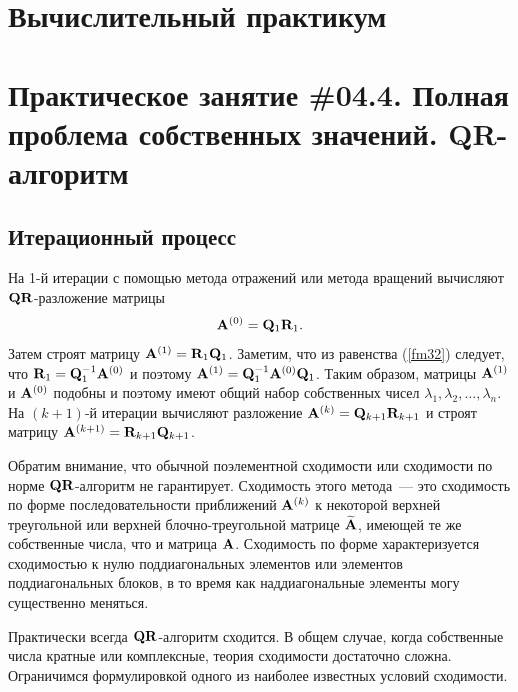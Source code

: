 \documentclass[12pt]{article}
\begin{document}
	\begin{flushright}
	\end{flushright}
	\begin{flushright}
	\end{flushright}
    \section*{Вычислительный практикум}
    \section*{Практическое занятие \#04.4. Полная проблема собственных значений. QR-алгоритм}

	\subsection*{Итерационный процесс}
	
	На 1-й итерации с помощью метода отражений или метода вращений вычисляют $\bold{QR}$-разложение матрицы
	\begin{equation}
		\bold{A}^{\left(0\right)}=\bold{Q}_1\bold{R}_1.\label{fm32}
	\end{equation}
	Затем строят матрицу $\bold{A}^{\left(1\right)}=\bold{R}_1\bold{Q}_1$. Заметим, что из равенства (\ref{fm32}) следует, что $\bold{R}_1=\bold{Q}^{-1}_1\bold{A}^{\left(0\right)}$ и поэтому $\bold{A}^{\left(1\right)}=\bold{Q}_1^{-1}\bold{A}^{\left(0\right)}\bold{Q}_1$. Таким образом, матрицы $\bold{A}^{\left(1\right)}$ и $\bold{A}^{\left(0\right)}$ подобны и поэтому имеют общий набор собственных чисел $\lambda_1,\lambda_2,\ldots,\lambda_n$. На $\left(k+1\right)$-й итерации вычисляют разложение $\bold{A}^{\left(k\right)}=\bold{Q}_{k+1}\bold{R}_{k+1}$ и строят матрицу $\bold{A}^{\left(k+1\right)}=\bold{R}_{k+1}\bold{Q}_{k+1}$.
	
	Обратим внимание, что обычной поэлементной сходимости или сходимости по норме $\bold{QR}$-алгоритм не гарантирует. Сходимость этого метода~--- это сходимость по форме последовательности приближений $\bold{A}^{\left(k\right)}$ к некоторой верхней треугольной или верхней блочно-треугольной матрице $\widetilde{\bold{A}}$, имеющей те же собственные числа, что и матрица $\bold{A}$. Сходимость по форме характеризуется сходимостью к нулю поддиагональных элементов или элементов поддиагональных блоков, в то время как наддиагональные элементы могу существенно меняться.
	
	Практически всегда $\bold{QR}$-алгоритм сходится. В общем случае, когда собственные числа кратные или комплексные, теория сходимости достаточно сложна. Ограничимся формулировкой одного из наиболее известных условий сходимости.
	
\end{document}
